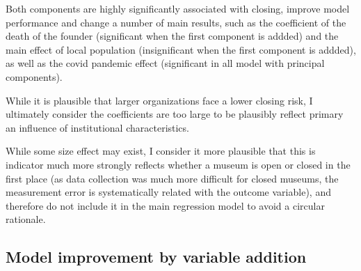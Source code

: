 \documentclass[12pt]{article}
\begin{document}
Both components are highly significantly associated with closing, improve model performance and change a number of main results, such as the coefficient of the death of the founder (significant when the first component is addded) and the main effect of local population (insignificant when the first component is addded), as well as the covid pandemic effect (significant in all model with principal components).


While it is plausible that larger organizations face a lower closing risk, I ultimately consider the coefficients are too large to be plausibly reflect primary an influence of institutional characteristics.

While some size effect may exist, I consider it more plausible that this is indicator much more strongly reflects whether a museum is open or closed in the first place (as data collection was much more difficult for closed museums, the  measurement error is systematically related with the outcome variable), and therefore do not include it in the main regression model to avoid a circular rationale.
\subsection*{Model improvement by variable addition}
\end{document}
